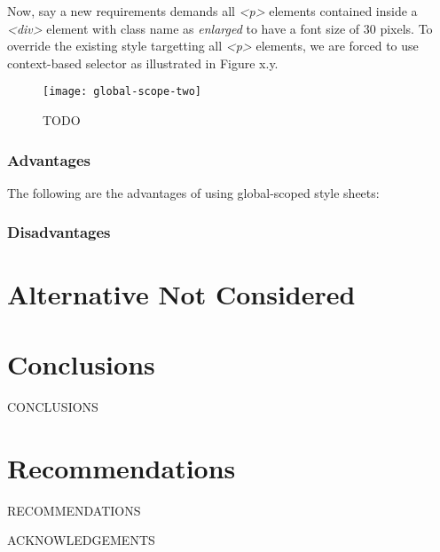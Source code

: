 \documentclass[12pt]{article}
\begin{document}
Now, say a new requirements demands all \textit{<p>} elements contained inside a \textit{<div>} element with class name as \textit{enlarged} to have a font size of 30 pixels. To override the existing style targetting all \textit{<p>} elements, we are forced to use context-based selector as illustrated in Figure x.y.

\vspace{0.5cm}

\begin{figure}[h]
\texttt{[image: global-scope-two]}
\centering
\caption{TODO}
\end{figure}

\vspace{0.5cm}


\subsubsection{Advantages}
The following are the advantages of using global-scoped style sheets:


\subsubsection{Disadvantages}

\newpage

\section{Alternative Not Considered}
\newpage

\section{Conclusions}
CONCLUSIONS
\newpage

\section{Recommendations}
RECOMMENDATIONS
\newpage



\newpage


ACKNOWLEDGEMENTS
\newpage


\end{document}
